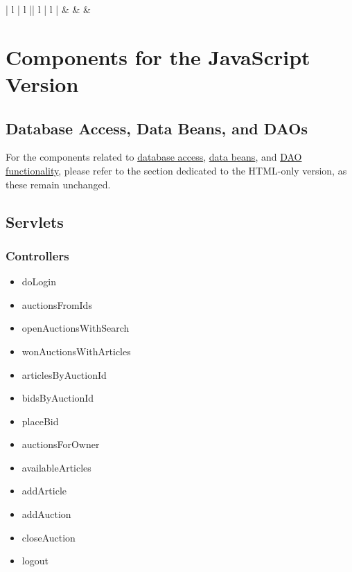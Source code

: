 \documentclass[12pt, a4paper, renqo, final]{amsart}
\let\stdsection\section
\renewcommand{\section}{\newpage\stdsection}
\begin{document}
\begin{NiceTabular}{ | l | l || l | l | }
					 &  &  &  \\
					\Hline
				\end{NiceTabular}
				\newpage
		\section[RIA - Components]{Components for the JavaScript Version}
			\subsection{Database Access, Data Beans, and DAOs}
				For the components related to \hyperref[accessodb]{database access}, \hyperref[databeans]{data beans}, and \hyperref[dao]{DAO functionality}, please refer to the section dedicated to the HTML-only version, as these remain unchanged.

			\subsection{Servlets}
				\subsubsection{Controllers}
					\begin{itemize}
						\item doLogin
						\item auctionsFromIds
						\item openAuctionsWithSearch
						\item wonAuctionsWithArticles
						\item articlesByAuctionId
						\item bidsByAuctionId
						\item placeBid
						\item auctionsForOwner
						\item availableArticles
						\item addArticle
						\item addAuction
						\item closeAuction
						\item logout
					\end{itemize}
\end{document}
